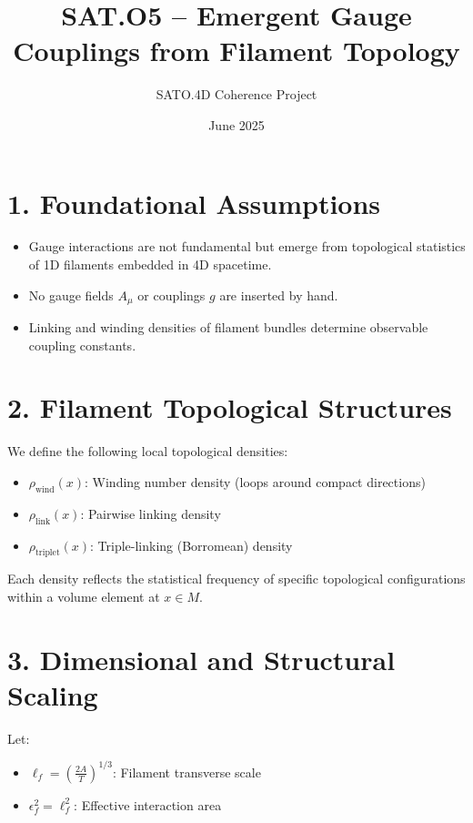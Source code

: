 \documentclass[12pt]{article}
\title{SAT.O5 – Emergent Gauge Couplings from Filament Topology}
\author{SATO.4D Coherence Project}
\date{June 2025}
\begin{document}
\maketitle

\section*{1. Foundational Assumptions}

\begin{itemize}
    \item Gauge interactions are not fundamental but emerge from topological statistics of 1D filaments embedded in 4D spacetime.
    \item No gauge fields \( A_\mu \) or couplings \( g \) are inserted by hand.
    \item Linking and winding densities of filament bundles determine observable coupling constants.
\end{itemize}

\section*{2. Filament Topological Structures}

We define the following local topological densities:
\begin{itemize}
    \item \( \rho_{\text{wind}}(x) \): Winding number density (loops around compact directions)
    \item \( \rho_{\text{link}}(x) \): Pairwise linking density
    \item \( \rho_{\text{triplet}}(x) \): Triple-linking (Borromean) density
\end{itemize}

Each density reflects the statistical frequency of specific topological configurations within a volume element at \( x \in M \).

\section*{3. Dimensional and Structural Scaling}

Let:
\begin{itemize}
    \item \( \ell_f = \left( \frac{2A}{T} \right)^{1/3} \): Filament transverse scale
    \item \( \epsilon^2_f = \ell_f^2 \): Effective interaction area
\end{itemize}
\end{document}
